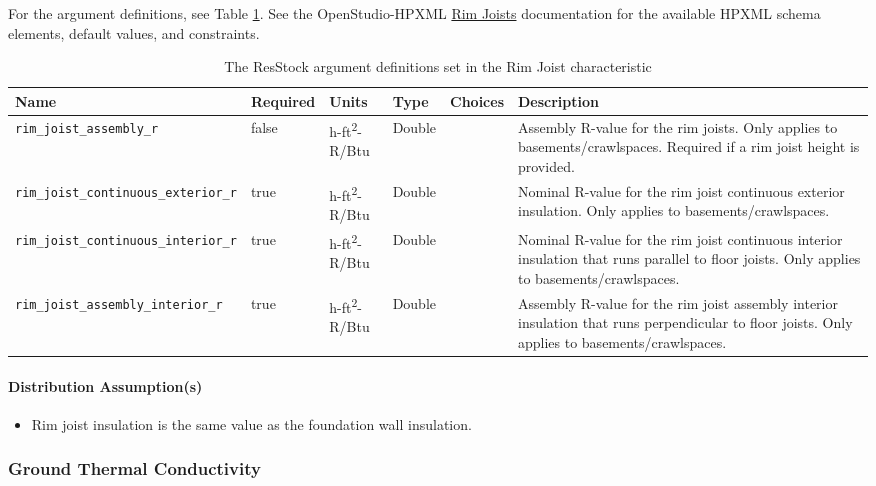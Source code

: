 For the argument definitions, see Table \ref{table:hc_arg_def_ins_rim_joists}. See the OpenStudio-HPXML \href{https://openstudio-hpxml.readthedocs.io/en/v1.8.1/workflow_inputs.html#hpxml-rim-joists}{Rim Joists} documentation for the available HPXML schema elements, default values, and constraints.

\begin{longtable}[]{|p{3.5cm}|p{1.5cm}|p{1.3cm}|p{1.1cm}|p{}|p{3.3cm}|}
\caption{The ResStock argument definitions set in the Rim Joist characteristic}
\label{table:hc_arg_def_ins_rim_joists} \\

\toprule\noalign{}
Name & Required & Units & Type & Choices & Description \\
\midrule\noalign{}
\endhead
\bottomrule\noalign{}
\endlastfoot
\texttt{rim\_joist\_assembly\_r} & false & h-ft\textsuperscript{2}-R/Btu & Double & &
Assembly R-value for the rim joists. Only applies to
basements/crawlspaces. Required if a rim joist height is provided. \\
\hline
\texttt{rim\_joist\_continuous\_exterior\_r} & true & h-ft\textsuperscript{2}-R/Btu &
Double & & Nominal R-value for the rim joist continuous exterior
insulation. Only applies to basements/crawlspaces. \\
\hline
\texttt{rim\_joist\_continuous\_interior\_r} & true & h-ft\textsuperscript{2}-R/Btu &
Double & & Nominal R-value for the rim joist continuous interior
insulation that runs parallel to floor joists. Only applies to
basements/crawlspaces. \\
\hline
\texttt{rim\_joist\_assembly\_interior\_r} & true & h-ft\textsuperscript{2}-R/Btu &
Double & & Assembly R-value for the rim joist assembly interior
insulation that runs perpendicular to floor joists. Only applies to
basements/crawlspaces. \\
\end{longtable}

\paragraph{Distribution Assumption(s)}
\begin{itemize}
 
\item
  Rim joist insulation is the same value as the foundation wall
  insulation.
\end{itemize}

\subsubsection{Ground Thermal
Conductivity}\label{ground_thermal_conductivity}
